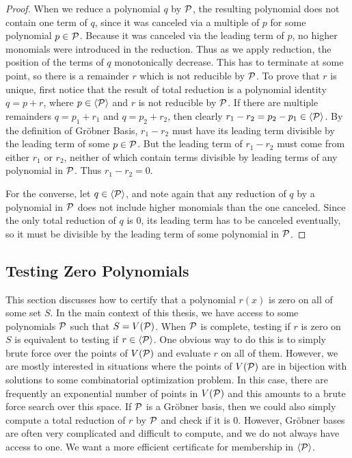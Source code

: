 \begin{proof}
When we reduce a polynomial $q$ by $\mathcal P$, the resulting polynomial does not contain one term of $q$, since it was canceled via a multiple of $p$ for some polynomial $p \in \mathcal P$. Because it was canceled via the leading term of $p$, no higher monomials were introduced in the reduction. Thus as we apply reduction, the position of the terms of $q$ monotonically decrease. This has to terminate at some point, so there is a remainder $r$ which is not reducible by $\mathcal P$. To prove that $r$ is unique, first notice that the result of total reduction is a polynomial identity $q = p + r$, where $p \in \langle \mathcal P \rangle$ and $r$ is not reducible by $\mathcal P$. If there are multiple remainders $q = p_1 + r_1$ and $q = p_2 + r_2$, then clearly $r_1 - r_2 = p_2 - p_1 \in \langle \mathcal P \rangle$. By the definition of Gr\"obner Basis, $r_1 - r_2$ must have its leading term divisible by the leading term of some $p \in \mathcal P$. But the leading term of $r_1 - r_2$ must come from either $r_1$ or $r_2$, neither of which contain terms divisible by leading terms of any polynomial in $\mathcal P$. Thus $r_1 - r_2 = 0$.

For the converse, let $q \in \langle \mathcal P \rangle$, and note again that any reduction of $q$ by a polynomial in $\mathcal P$ does not include higher monomials than the one canceled. Since the only total reduction of $q$ is $0$, its leading term has to be canceled eventually, so it must be divisible by the leading term of some polynomial in $\mathcal P$.
\end{proof}

\subsection{Testing Zero Polynomials}

This section discusses how to certify that a polynomial $r(x)$ is zero on all of some set $S$.
In the main context of this thesis, we have access to some polynomials $\mathcal P$ such that $S = V(\mathcal P)$.
When $\mathcal P$ is complete, testing if $r$ is zero on $S$ is equivalent to testing if $r \in \langle \mathcal P \rangle$.
One obvious way to do this is to simply brute force over the points of $V(\mathcal P)$ and evaluate $r$ on all of them.
However, we are mostly interested in situations where the points of $V(\mathcal P)$ are in bijection with solutions to some combinatorial optimization problem.
In this case, there are frequently an exponential number of points in $V(\mathcal P)$ and this amounts to a brute force search over this space.
If $\mathcal P$ is a Gr\"obner basis, then we could also simply compute a total reduction of $r$ by $\mathcal P$ and check if it is $0$.
However, Gr\"obner bases are often very complicated and difficult to compute, and we do not always have access to one.
We want a more efficient certificate for membership in $\langle \mathcal P \rangle$.

